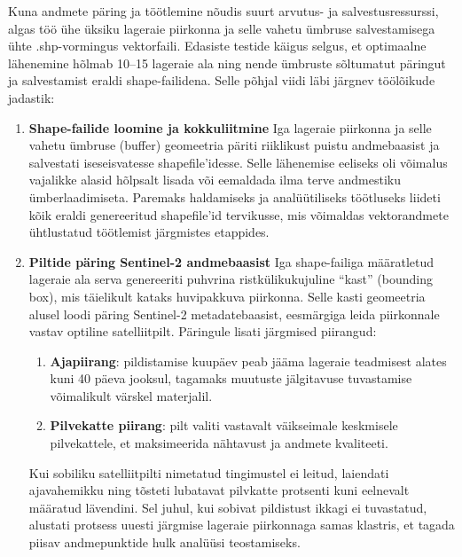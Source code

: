 Kuna andmete päring ja töötlemine nõudis suurt arvutus- ja salvestusressurssi,
algas töö ühe üksiku lageraie piirkonna ja selle vahetu ümbruse salvestamisega
ühte .shp-vormingus vektorfaili. Edasiste testide käigus selgus, et optimaalne
lähenemine hõlmab 10--15 lageraie ala ning nende ümbruste sõltumatut päringut ja
salvestamist eraldi shape-failidena. Selle põhjal viidi läbi järgnev töölõikude
jadastik:
\begin{enumerate}[topsep=1pt,itemsep=1ex,partopsep=1ex,parsep=1ex]

\item \textbf{Shape-failide loomine ja kokkuliitmine}\newline
Iga lageraie piirkonna ja selle vahetu
ümbruse (buffer) geomeetria päriti riiklikust puistu andmebaasist ja salvestati
iseseisvatesse shapefile'idesse. Selle lähenemise eeliseks oli võimalus
vajalikke alasid hõlpsalt lisada või eemaldada ilma terve andmestiku
ümberlaadimiseta. Paremaks haldamiseks ja analüütiliseks töötluseks liideti kõik
eraldi genereeritud shapefile'id  tervikusse, mis võimaldas
vektorandmete ühtlustatud töötlemist järgmistes etappides.

\item \textbf{Piltide päring Sentinel-2 andmebaasist} \newline
Iga shape-failiga määratletud lageraie
ala serva genereeriti puhvrina ristkülikukujuline ``kast'' (bounding box), mis
täielikult kataks huvipakkuva piirkonna. Selle kasti geomeetria alusel loodi
päring Sentinel-2 metadatebaasist, eesmärgiga leida piirkonnale vastav optiline
satelliitpilt. Päringule lisati järgmised piirangud:

\begin{enumerate}

\item \textbf{Ajapiirang}: pildistamise kuupäev peab jääma lageraie teadmisest alates kuni 40
päeva jooksul, tagamaks muutuste jälgitavuse tuvastamise võimalikult värskel
materjalil.

\item \textbf{Pilvekatte piirang}: pilt valiti vastavalt väikseimale keskmisele pilvekattele,
et maksimeerida nähtavust ja andmete kvaliteeti.
\end{enumerate}

Kui sobiliku satelliitpilti nimetatud tingimustel ei leitud,
laiendati ajavahemikku ning tõsteti lubatavat pilvkatte protsenti kuni eelnevalt
määratud lävendini. Sel juhul, kui sobivat pildistust ikkagi ei tuvastatud,
alustati protsess uuesti järgmise lageraie piirkonnaga samas klastris, et tagada
piisav andmepunktide hulk analüüsi teostamiseks.


\end{enumerate}
